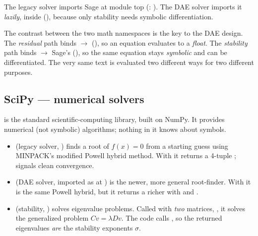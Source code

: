 The legacy solver imports Sage at module top (:
). The DAE solver imports it \emph{lazily},
inside  (), because
only stability needs symbolic differentiation.

\begin{note}
The contrast between the two math namespaces is the key to the DAE design. The
\emph{residual} path binds  $\to$  (),
so an equation evaluates to a \emph{float}. The \emph{stability} path binds
 $\to$ Sage's  (), so the same equation
stays \emph{symbolic} and can be differentiated. The very same text is evaluated
two different ways for two different purposes.
\end{note}

\subsection{SciPy --- numerical solvers}

 is the standard scientific-computing library, built on NumPy. It
provides numerical (not symbolic) algorithms; nothing in it knows about symbols.

\begin{itemize}
  \item {} (legacy solver, )
        finds a root of $f(x)=0$ from a starting guess using MINPACK's modified
        Powell hybrid method. With  it returns a 4-tuple
        ;  signals clean
        convergence.
  \item {} (DAE solver, imported as 
        at ) is the newer, more general
        root-finder. With  it is the same Powell hybrid, but
        it returns a richer  with  and
        .
  \item {} (stability, )
        solves eigenvalue problems. Called with \emph{two} matrices,
        , it solves the generalized problem $C v = \lambda D v$.
        The code calls , so the returned eigenvalues \emph{are}
        the stability exponents $\sigma$.
\end{itemize}

